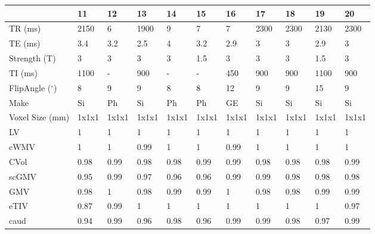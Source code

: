 \begin{table}
[]
\centering
\begin{tabular}{lllllllllll}
\toprule
{} &     11 &     12 &     13 &     14 &     15 &     16 &     17 &     18 &     19 &     20 \\
\midrule
TR (ms)                            &   2150 &      6 &   1900 &      9 &      7 &      7 &   2300 &   2300 &   2130 &   2300 \\
TE (ms)                           &    3.4 &    3.2 &    2.5 &      4 &    3.2 &    2.9 &      3 &      3 &    2.9 &      3 \\
Strength (T)                      &      3 &      3 &      3 &      3 &    1.5 &      3 &      3 &      3 &    1.5 &      3 \\
TI (ms)                           &   1100 &      - &    900 &      - &      - &    450 &    900 &    900 &   1100 &    900 \\
FlipAngle ($^{\circ}$)                     &      8 &      9 &      9 &      8 &      8 &     12 &      9 &      9 &     15 &      9 \\
Make                          &     Si &     Ph &     Si &     Ph &     Ph &     GE &     Si &     Si &     Si &     Si \\
Voxel Size (mm)                    &  1x1x1 &  1x1x1 &  1x1x1 &  1x1x1 &  1x1x1 &  1x1x1 &  1x1x1 &  1x1x1 &  1x1x1 &  1x1x1 \\
\bottomrule
LV             &      1 &      1 &      1 &      1 &      1 &      1 &      1 &      1 &      1 &      1 \\
cWMV        &      1 &      1 &   0.99 &      1 &      1 &   0.99 &      1 &      1 &      1 &      1 \\
CVol                     &   0.98 &   0.99 &   0.98 &   0.98 &   0.99 &   0.99 &   0.98 &   0.98 &   0.98 &   0.99 \\
scGMV                &   0.95 &   0.99 &   0.97 &   0.96 &   0.96 &   0.99 &   0.99 &   0.98 &   0.98 &   0.98 \\
GMV                  &   0.98 &      1 &   0.98 &   0.99 &   0.99 &      1 &   0.98 &   0.98 &   0.99 &   0.99 \\
eTIV &   0.87 &   0.99 &      1 &      1 &      1 &      1 &      1 &      1 &      1 &   0.97 \\
caud                       &   0.94 &   0.99 &   0.96 &   0.98 &   0.96 &   0.99 &   0.99 &   0.98 &   0.97 &   0.99 \\

\end{tabular}
\end{table}
